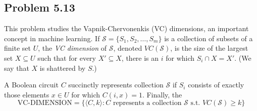 \documentclass[a4paper]{article}
\begin{document}
\subsection*{Problem 5.13}

This problem studies the Vapnik-Chervonenkis (VC) dimensions, an important concept in machine
learning. If $\mathcal{S} = \{S_1, S_2, \ldots, S_m\}$ is a collection of subsets of a finite set
$U$, the \textit{VC dimension} of $\mathcal{S}$, denoted $VC(\mathcal{S})$, is the size of the
largest set $X \subseteq U$ such that for every $X' \subseteq X$, there is an $i$ for which $S_i
\cap X = X'$. (We say that $X$ is shattered by $S$.)

A Boolean circuit $C$ succinctly represents collection $\mathcal{S}$ if $S_i$ consists of exactly
those elements $x \in U$ for which $C(i, x) = 1$. Finally, the
\[
  \text{VC-DIMENSION} = \{\langle C, k \rangle : C \text{ represents a collection } \mathcal{S} \text{ s.t. } VC(\mathcal{S}) \geq k\}
\]
\end{document}
